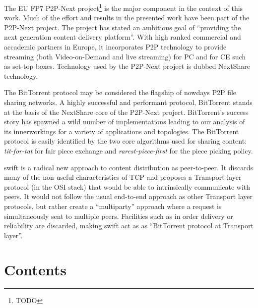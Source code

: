 The EU FP7 P2P-Next project\footnote{TODO} is the major component in the
context of this work. Much of the effort and results in the presented work
have been part of the P2P-Next project. The project has stated an ambitious
goal of ``providing the next generation content delivery platform''. With high
ranked commercial and accademic partners in Europe, it incorporates P2P
technology to provide streaming (both Video-on-Demand and live streaming) for
PC and for CE such as set-top boxes. Technology used by the P2P-Next project
is dubbed NextShare technology.

The BitTorrent protocol may be considered the flagship of nowdays P2P file
sharing networks. A highly successful and performant protocol, BitTorrent
stands at the basis of the NextShare core of the P2P-Next project.
BitTorrent's success story has spawned a wild number of implementations
leading to our analysis of its innerworkings for a variety of applications and
topologies. The BitTorrent protocol is easily identified by the two core
algorithms used for sharing content: \textit{tit-for-tat} for fair piece
exchange and \textit{rarest-piece-first} for the piece picking policy.

swift is a radical new approach to content distribution as peer-to-peer. It
discards many of the non-useful characteristics of TCP and proposes a
Transport layer protocol (in the OSI stack) that would be able to
intrinsically communicate with peers. It would not follow the usual end-to-end
approach as other Transport layer protocols, but rather create a
``multiparty'' approach where a request is simultaneously sent to multiple
peers. Facilities such as in order delivery or reliability are discarded,
making swift act as as ``BitTorrent protocol at Transport layer''.


\section{Contents}
\label{sec:intro:contents}

